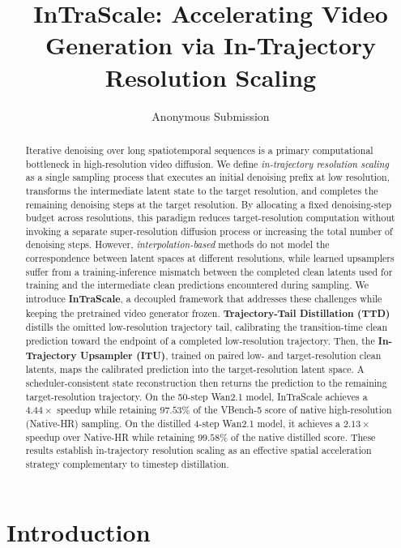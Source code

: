 \documentclass[letterpaper]{article} %
\title{InTraScale: Accelerating Video Generation via In-Trajectory Resolution Scaling}
\author{Anonymous Submission}
\begin{document}
\maketitle

\begin{abstract}
Iterative denoising over long spatiotemporal sequences is a primary
computational bottleneck in high-resolution video diffusion.
We define \emph{in-trajectory resolution scaling} as a single sampling
process that executes an initial denoising prefix at low resolution,
transforms the intermediate latent state to the target resolution, and
completes the remaining denoising steps at the target resolution.
By allocating a fixed denoising-step budget across resolutions, this
paradigm reduces target-resolution computation without invoking a
separate super-resolution diffusion process or increasing the total
number of denoising steps. However, \textit{interpolation-based} methods
do not model the correspondence between latent spaces at different
resolutions, while learned upsamplers suffer from a training-inference
mismatch between the completed clean latents used for training and the
intermediate clean predictions encountered during sampling.
We introduce \textbf{InTraScale}, a decoupled framework that addresses
these challenges while keeping the pretrained video generator frozen.
\textbf{Trajectory-Tail Distillation (TTD)} distills the omitted
low-resolution trajectory tail, calibrating the transition-time clean
prediction toward the endpoint of a completed low-resolution trajectory.
Then, the \textbf{In-Trajectory Upsampler (ITU)}, trained on paired
low- and target-resolution clean latents, maps the calibrated prediction
into the target-resolution latent space. A scheduler-consistent state
reconstruction then returns the prediction to the remaining
target-resolution trajectory.
On the 50-step Wan2.1 model, InTraScale achieves a \(4.44\times\)
speedup while retaining \(97.53\%\) of the VBench-5 score of native
high-resolution (Native-HR) sampling.
On the distilled 4-step Wan2.1 model, it achieves a \(2.13\times\)
speedup over Native-HR while retaining \(99.58\%\) of the native
distilled score. These results establish in-trajectory resolution
scaling as an effective spatial acceleration strategy complementary
to timestep distillation.
\end{abstract}

\section{Introduction}
\end{document}
